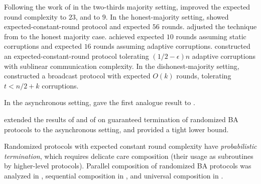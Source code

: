 Following the work of \citet{FM97} in the two-thirds majority setting, \citet{KK06} improved the expected round complexity to $23$, and \citet{Micali17} to $9$. In the honest-majority setting, \citet{FG03} showed expected-constant-round protocol and \citet{KK06} expected $56$ rounds. \citet{MV17} adjusted the technique from \cite{Micali17} to the honest majority case. \citet{ADDNR19} achieved expected $10$ rounds assuming static corruptions and expected $16$ rounds assuming adaptive corruptions. \citet{ACDNPRS19} constructed an expected-constant-round protocol tolerating $(1/2-\epsilon)n$ adaptive corruptions with sublinear communication complexity. In the dishonest-majority setting, \citet{GKKO07} constructed a broadcast protocol with expected $O(k)$ rounds, tolerating $t<n/2+k$ corruptions.

\ifdefined\IsFullVersion
In the asynchronous setting, \citet{CR93} gave the first analogue result to \cite{FM97}. 
\fi

\citet{AH10} extended the results of \citet{CMS89} and of \citet{KY86} on guaranteed termination of randomized BA protocols to the asynchronous setting, and provided a tight lower bound.

Randomized protocols with expected constant round complexity have \emph{probabilistic termination}, which requires delicate care \wrt composition (\ie their usage as subroutines by higher-level protocols). Parallel composition of randomized BA protocols was analyzed in \cite{Ben-Or83,FG03}, sequential composition in \cite{LLR06}, and universal composition in \cite{CCGZ16,CCGZ17}.
